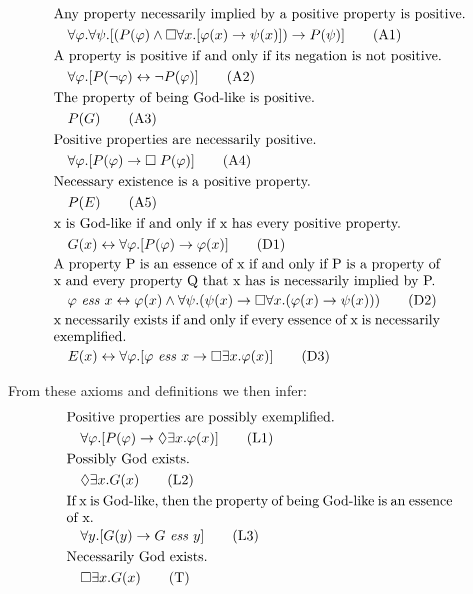 \documentclass{llncs}
\newcommand{\imp}{\rightarrow}
\newcommand{\biimp}{\leftrightarrow}
\newcommand{\all}{\forall}
\newcommand{\ex}{\exists}
\newcommand{\nec}{\Box} %
\newcommand{\pos}{\Diamond} %
\newcommand{\ess}[2]{#1 \ \mathit{ess} \ #2}
\begin{document}
\begin{align}
& \text{Any property necessarily implied by a positive property is positive.} \notag \\
& \quad 
\all \varphi. \all \psi.[(P(\varphi) \wedge \nec \all x.[\varphi(x) \imp \psi(x)]) \imp P(\psi)] \tag{A1} \\
& \text{A property is positive if and only if its negation is not positive.} \notag \\
& \quad 
\all \varphi. [P(\neg \varphi) \biimp \neg P(\varphi)]
\tag{A2} \\
& \text{The property of being God-like is positive.} \notag \\
& \quad 
P(G) 
\tag{A3} \\
& \text{Positive properties are necessarily positive.} \notag \\
& \quad 
\all \varphi.[P(\varphi) \to \Box \; P(\varphi)]
\tag{A4} \\
& \text{Necessary existence is a positive property.} \notag \\
& \quad 
P(E)
\tag{A5} \\
& \text{x is God-like if and only if x has every positive property.} \notag \\
& \quad 
G(x) \biimp \forall \varphi. [P(\varphi) \to \varphi(x)]
\tag{D1} \\ 
& \parbox[c][2em][c]{0.8\textwidth}{A property P is an essence of x if and only if P is a property of x and every property Q that x has is necessarily implied by P.}\notag \\
& \quad 
\ess{\varphi}{x} \biimp \varphi(x) \wedge \all \psi. (\psi(x) \imp \nec \all x. (\varphi(x) \imp \psi(x)))
\tag{D2} \\
& \parbox[c][2em][c]{0.8\textwidth}{x necessarily exists if and only if every essence of x is necessarily exemplified.} \notag \\
& \quad 
E(x) \biimp \all \varphi.[\ess{\varphi}{x} \imp \nec \ex x.\varphi(x)] 
\tag{D3} 
\end{align}

\noindent
From these axioms and definitions we then infer:
\begin{align}
& \text{Positive properties are possibly exemplified.} \notag \\
& \quad 
\all \varphi. [P(\varphi) \imp \pos \ex x.\varphi(x)]
\tag{L1} \\
& \text{Possibly God exists.} \notag \\
& \quad 
\pos \ex x. G(x)
\tag{L2} \\
& \parbox[c][2em][c]{0.8\textwidth}{If x is God-like, then the property of being God-like is an essence of x.} \notag \\
& \quad 
\all y.[G(y) \imp \ess{G}{y}]
\tag{L3} \\
& \text{Necessarily God exists.} \notag \\
& \quad 
\nec \ex x. G(x)
\tag{T}
\end{align}
\end{document}
